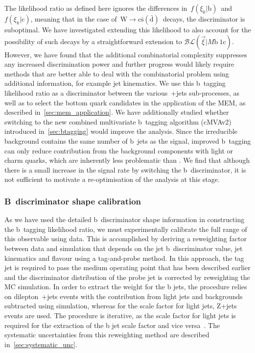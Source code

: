 The likelihood ratio as defined here ignores the differences in~$f(\xi_k | \mathrm{b})$~and~$f(\xi_k | \mathrm{c})$, meaning that in the case of~$\mathrm{W} \rightarrow \mathrm{c}\bar{\mathrm{s}} (\bar{\mathrm{d}})$~decays, the discriminator is suboptimal. We have investigated extending this likelihood to also account for the possibility of such decays by a straightforward extension to $\mathcal{BL}(\vec{\xi} | M\mathrm{b}~1\mathrm{c})$. However, we have found that the additional combinatorial complexity suppresses any increased discrimination power and further progress would likely require methods that are better able to deal with the combinatorial problem using additional information, for example jet kinematics. We use this b~tagging likelihood ratio as a discriminator between the various~\ttbar+jets sub-processes, as well as to select the bottom quark candidates in the application of the MEM, as described in~\cref{sec:mem_application}. We have additionally studied whether switching to the new combined multivariate b~tagging algorithm (cMVAv2) introduced in~\cref{sec:btagging} would improve the analysis. Since the irreducible \ttbb\xspace background contains the same number of b~jets as the \ttHbb\xspace signal, improved b~tagging can only reduce contribution from the background components with light or charm quarks, which are inherently less problematic than \ttbb. We find that although there is a small increase in the signal rate by switching the b~discriminator, it is not sufficient to motivate a re-optimisation of the analysis at this stage. 

\subsubsection{B~discriminator shape calibration}
As we have used the detailed b~discriminator shape information in constructing the b~tagging likelihood ratio, we must experimentally calibrate the full range of this observable using data. This is accomplished by deriving a reweighting factor between data and simulation that depends on the jet b~discriminator value, jet kinematics and flavour using a tag-and-probe method. In this approach, the tag jet is required to pass the medium operating point that has been described earlier and the discriminator distribution of the probe jet is corrected by reweighting the MC simulation. In order to extract the weight for the b jets, the procedure relies on dilepton~\ttbar+jets events with the contribution from light jets and backgrounds subtracted using simulation, whereas for the scale factor for light jets, Z+jets events are used. The procedure is iterative, as the scale factor for light jets is required for the extraction of the b jet scale factor and vice versa~\cite{CMS:2013sea,CMS-PAS-BTV-15-001}. The systematic uncertainties from this reweighting method are described in~\cref{sec:systematic_unc}.

